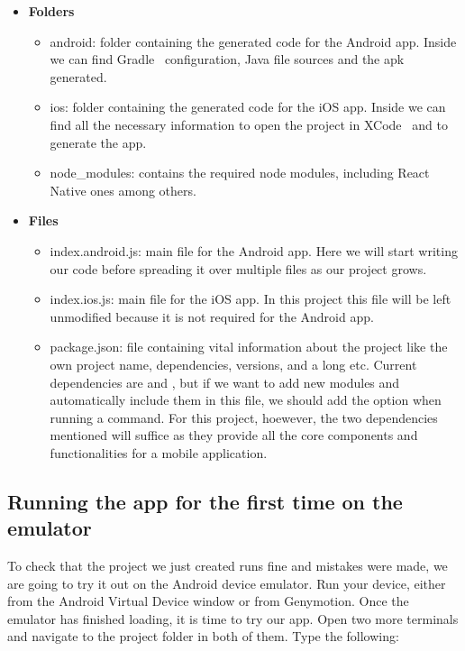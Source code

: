 \begin{itemize}
 \item \textbf{Folders}
  \begin{itemize}
   \item android: folder containing the generated code for the Android app. Inside we can find Gradle~\cite{gradle} configuration, Java file sources and the apk generated.
   \item ios: folder containing the generated code for the iOS app. Inside we can find all the necessary information to open the project in XCode~\cite{xcode} and to generate the app.
   \item node\_modules: contains the required node modules, including React Native ones among others.
  \end{itemize}
 \item \textbf{Files}
  \begin{itemize}
   \item index.android.js: main file for the Android app. Here we will start writing our code before spreading it over multiple files as our project grows.
   \item index.ios.js: main file for the iOS app. In this project this file will be left unmodified because it is not required for the Android app.
   \item package.json: file containing vital information about the project like the own project name, dependencies, versions, and a long etc. Current dependencies are  and , but if we want to add new modules and automatically include them in this file, we should add the  option when running a  command. For this project, hoewever, the two dependencies mentioned will suffice as they provide all the core components and functionalities for a mobile application.
  \end{itemize}
\end{itemize}

\subsection{Running the app for the first time on the emulator}

To check that the project we just created runs fine and mistakes were made, we are going to try it out on the Android device emulator. Run your device, either from the Android Virtual Device window or from Genymotion. Once the emulator has finished loading, it is time to try our app. Open two more terminals and navigate to the project folder in both of them. Type the following:

